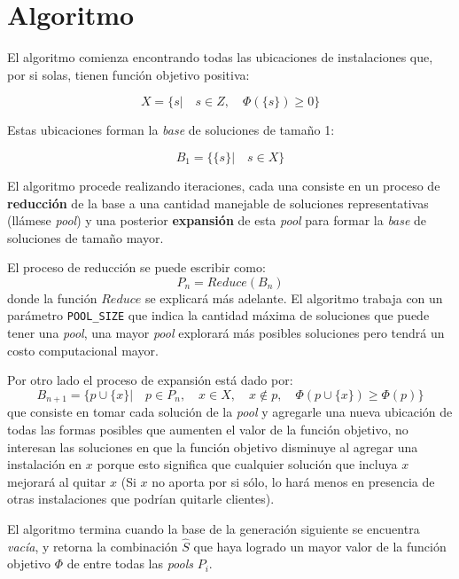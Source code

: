 \section{Algoritmo}

El algoritmo comienza encontrando todas las ubicaciones de instalaciones que, por si solas, tienen función objetivo positiva:

\begin{equation}
X = \{ s |  \quad s \in Z, \quad \Phi(\{s\}) \geq 0 \}
\end{equation}

Estas ubicaciones forman la \emph{base} de soluciones de tamaño 1:

\begin{equation}
B_1 = \{ \{s\} | \quad s \in X \}
\end{equation}

El algoritmo procede realizando iteraciones, cada una consiste en un proceso de \textbf{reducción} de la base a una cantidad manejable de soluciones representativas (llámese \emph{pool}) y una posterior \textbf{expansión} de esta \emph{pool} para formar la \emph{base} de soluciones de tamaño mayor.

El proceso de reducción se puede escribir como:
\begin{equation}
P_n = Reduce(B_n)
\end{equation}
donde la función $Reduce$ se explicará más adelante. El algoritmo trabaja con un parámetro \texttt{POOL\_SIZE} que indica la cantidad máxima de soluciones que puede tener una \emph{pool}, una mayor \emph{pool} explorará más posibles soluciones pero tendrá un costo computacional mayor.

Por otro lado el proceso de expansión está dado por:
\begin{equation}
B_{n+1} = \{p \cup \{x\} |
    \quad p \in P_n, \quad x \in X, \quad x \notin p, \quad \Phi(p \cup \{x\}) \geq \Phi(p) \}
\end{equation}
que consiste en tomar cada solución de la \emph{pool} y agregarle una nueva ubicación de todas las formas posibles que aumenten el valor de la función objetivo, no interesan las soluciones en que la función objetivo disminuye al agregar una instalación en $x$ porque esto significa que cualquier solución que incluya $x$ mejorará al quitar $x$ (Si $x$ no aporta por si sólo, lo hará menos en presencia de otras instalaciones que podrían quitarle clientes).

El algoritmo termina cuando la base de la generación siguiente se encuentra \emph{vacía}, y retorna la combinación $\hat{S}$ que haya logrado un mayor valor de la función objetivo $\Phi$ de entre todas las \emph{pools} $P_i$.

